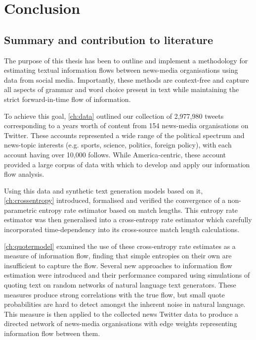 \chapter{Conclusion}\label{ch:conclusion}

\section{Summary and contribution to literature}


The purpose of this thesis has been to outline and implement a methodology for estimating textual information flows between news-media organisations using data from social media. Importantly, these methods are context-free and capture all aspects of grammar and word choice present in text while maintaining the strict forward-in-time flow of information.

To achieve this goal, \autoref{ch:data} outlined our collection of 2,977,980 tweets corresponding to a years worth of content from 154 news-media organisations on Twitter. These accounts represented a wide range of the political spectrum and news-topic interests (e.g. sports, science, politics, foreign policy), with each account having over 10,000 follows. While America-centric, these account provided a large corpus of data with which to develop and apply our information flow analysis.

Using this data and synthetic text generation models based on it, \autoref{ch:crossentropy} introduced, formalised and verified the convergence of a non-parametric entropy rate estimator based on match lengths. This entropy rate estimator was then generalised into a cross-entropy rate estimator which carefully incorporated time-dependency into its cross-source match length calculations. 

\autoref{ch:quotermodel} examined the use of these cross-entropy rate estimates as a measure of information flow, finding that simple entropies on their own are insufficient to capture the flow. Several new approaches to information flow estimation were introduced and their performance compared using simulations of quoting text on random networks of natural language text generators. These measures produce strong correlations with the true flow, but small quote probabilities are hard to detect amongst the inherent noise in natural language. This measure is then applied to the collected news Twitter data to produce a directed network of news-media organisations with edge weights representing information flow between them. 

